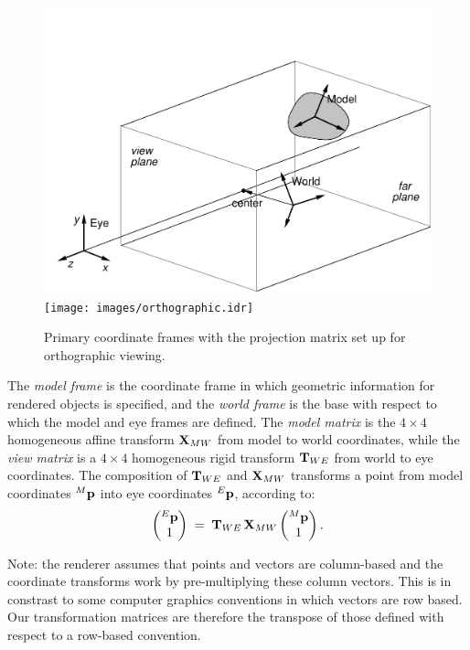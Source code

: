 %
\begin{figure}[t]
\begin{center}
\iflatexml
 \includegraphics[]{images/orthographic}
\else
 \texttt{[image: images/orthographic.idr]}
\fi
\end{center}
\caption{Primary coordinate frames with the projection matrix set up
for orthographic viewing.}
\label{orthographic:fig}
\end{figure}
%

The {\it model frame} is the coordinate frame in which geometric
information for rendered objects is specified, and the {\it world frame} is the
base with respect to which the model and eye frames are defined. The
{\it model matrix} is the $4 \times 4$ homogeneous affine transform
${\bf X}_{MW}$ from model to world coordinates, while the {\it view matrix}
is a $4 \times 4$ homogeneous rigid transform ${\bf T}_{WE}$ from world to eye
coordinates. The composition of ${\bf T}_{WE}$ and ${\bf X}_{MW}$ transforms a
point from model coordinates ${}^M{\bf p}$ into eye coordinates ${}^E{\bf p}$,
according to:
%
\begin{equation*}
\left(\begin{matrix} {}^E{\bf p} \\ 1 \end{matrix}\right) \;=\;
{\bf T}_{WE} \, {\bf X}_{MW} \left(\begin{matrix} {}^M{\bf p} \\ 1 \end{matrix}\right).
\end{equation*}
%

\begin{sideblock}
Note: the renderer assumes that points and vectors are column-based
and the coordinate transforms work by pre-multiplying these column
vectors. This is in constrast to some computer graphics conventions in
which vectors are row based. Our transformation matrices are therefore
the transpose of those defined with respect to a row-based convention.
\end{sideblock}


